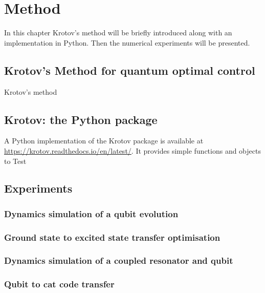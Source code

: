 \documentclass[main.tex]{subfiles}
\begin{document}
\chapter{Method}
In this chapter Krotov's method will be briefly introduced along with an implementation in Python. Then the numerical experiments will be presented.

\section{Krotov's Method for quantum optimal control}
Krotov's method 

\section{Krotov: the Python package}
A Python implementation of the Krotov package is available at \url{https://krotov.readthedocs.io/en/latest/}. It provides simple functions and objects to
Test

\section{Experiments}
\subsection{Dynamics simulation of a qubit evolution}

\subsection{Ground state to excited state transfer optimisation}
\subsection{Dynamics simulation of a coupled resonator and qubit}
\subsection{Qubit to cat code transfer}
\end{document}
